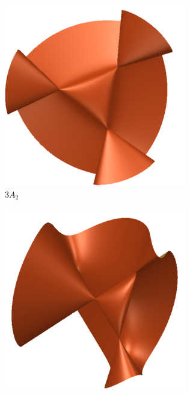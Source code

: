 \documentclass[12pt,reqno]{amsart}
\numberwithin{equation}{section}
\begin{document}
\begin{figure}
  \begin{subfigure}{.24\textwidth}
    \centering
    \includegraphics[width=\textwidth]{cubic3A2}
    \caption{$3A_2$}
  \end{subfigure}
  \begin{subfigure}{.24\textwidth}
    \centering
    \includegraphics[width=\textwidth]{cubicA3_2A1}

\end{subfigure}
\end{figure}
\end{document}
